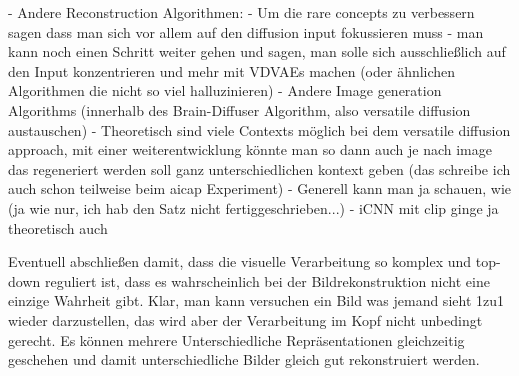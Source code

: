 - Andere Reconstruction Algorithmen:
    - Um die rare concepts zu verbessern sagen \cite{samuelGeneratingImagesRare2024} dass man sich vor allem auf den diffusion input fokussieren muss
        - man kann noch einen Schritt weiter gehen und sagen, man solle sich ausschließlich auf den Input konzentrieren und mehr mit VDVAEs machen (oder ähnlichen Algorithmen die nicht so viel halluzinieren)
    - Andere Image generation Algorithms (innerhalb des Brain-Diffuser Algorithm, also versatile diffusion austauschen)
    - Theoretisch sind viele Contexts möglich bei dem versatile diffusion approach, mit einer weiterentwicklung könnte man so dann auch je nach image das regeneriert werden soll ganz unterschiedlichen kontext geben (das schreibe ich auch schon teilweise beim aicap Experiment)
    - Generell kann man ja schauen, wie (ja wie nur, ich hab den Satz nicht fertiggeschrieben...)
    - iCNN mit clip ginge ja theoretisch auch


Eventuell abschließen damit, dass die visuelle Verarbeitung so komplex und top-down reguliert ist, dass es wahrscheinlich bei der Bildrekonstruktion nicht eine einzige Wahrheit gibt. Klar, man kann versuchen ein Bild was jemand sieht 1zu1 wieder darzustellen, das wird aber der Verarbeitung im Kopf nicht unbedingt gerecht. Es können mehrere Unterschiedliche Repräsentationen gleichzeitig geschehen und damit unterschiedliche Bilder gleich gut rekonstruiert werden. 